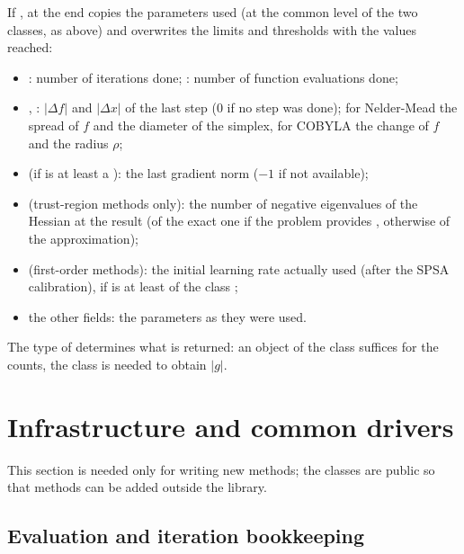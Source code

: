 If , at the end  copies the parameters used (at the common level of the two
classes, as above) and  overwrites the limits and thresholds with the values reached:
\begin{itemize}
\item {}: number of iterations done; : number of function evaluations done;
\item {}, : $|\Delta f|$ and $|\Delta x|$ of the last step (0 if no step was done); for
Nelder-Mead the spread of $f$ and the diameter of the simplex, for COBYLA the change of $f$ and the radius $\rho$;
\item {} (if  is at least a ): the last gradient norm
($-1$ if not available);
\item {} (trust-region methods only): the number of negative eigenvalues of the Hessian at the result (of the
exact one if the problem provides , otherwise of the approximation);
\item {} (first-order methods): the initial learning rate actually used (after the SPSA calibration), if
 is at least of the class ;
\item the other fields: the parameters as they were used.
\end{itemize}
The type of  determines what is returned: an object of the class  suffices for
the counts, the class  is needed to obtain $|g|$.

\section{Infrastructure and common drivers}\label{sec:optimize:drivers}

This section is needed only for writing new methods; the classes are public so that methods can be added outside the library.

\subsection{Evaluation and iteration bookkeeping}

